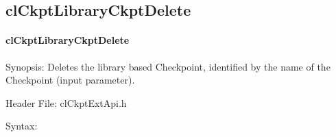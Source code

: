 \begin{flushleft}
\subsection{clCkptLibraryCkptDelete}
\hypertarget{pageckpt204}{}\paragraph{cl\-Ckpt\-Library\-Ckpt\-Delete}\label{pageckpt204}
\begin{Desc}
\item[Synopsis:]Deletes the library based Checkpoint, identified by the name of the Checkpoint (input parameter).\end{Desc}
\begin{Desc}
\item[Header File:]clCkptExtApi.h\end{Desc}
\begin{Desc}
\item[Syntax:]


\end{Desc}
\end{flushleft}
